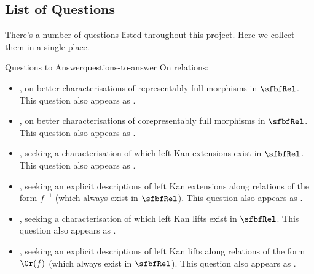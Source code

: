 \subsection{List of Questions}\label{subsection-list-of-questions}
There's a number of questions listed throughout this project. Here we collect them in a single place.
\begin{remark}{Questions to Answer}{questions-to-answer}%
    On relations:
    \begin{itemize}
        \item {}, on better characterisations of representably full morphisms in $\sfbfRel$. This question also appears as \cite{MO467527}.
        \item {}, on better characterisations of corepresentably full morphisms in $\sfbfRel$. This question also appears as \cite{MO467527}.
        \item {}, seeking a characterisation of which left Kan extensions exist in $\sfbfRel$. This question also appears as \cite{MO461592}.
        \item {}, seeking an explicit descriptions of left Kan extensions along relations of the form $f^{-1}$ (which always exist in $\sfbfRel$). This question also appears as \cite{MO461592}.
        \item {}, seeking a characterisation of which left Kan lifts exist in $\sfbfRel$. This question also appears as \cite{MO461592}.
        \item {}, seeking an explicit descriptions of left Kan lifts along relations of the form $\Gr(f)$ (which always exist in $\sfbfRel$). This question also appears as \cite{MO461592}.

\end{itemize}
\end{remark}
